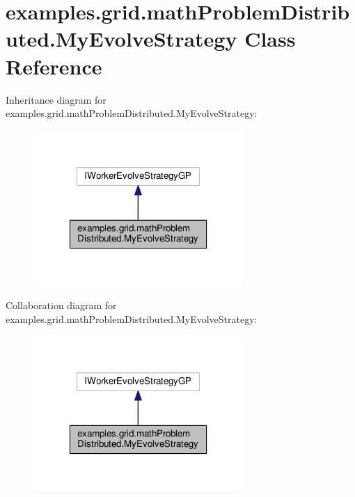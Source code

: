 \hypertarget{classexamples_1_1grid_1_1math_problem_distributed_1_1_my_evolve_strategy}{\section{examples.\-grid.\-math\-Problem\-Distributed.\-My\-Evolve\-Strategy Class Reference}
\label{classexamples_1_1grid_1_1math_problem_distributed_1_1_my_evolve_strategy}
}


Inheritance diagram for examples.\-grid.\-math\-Problem\-Distributed.\-My\-Evolve\-Strategy\-:
\nopagebreak
\begin{figure}[H]
\begin{center}
\leavevmode
\includegraphics[width=226pt]{classexamples_1_1grid_1_1math_problem_distributed_1_1_my_evolve_strategy__inherit__graph}
\end{center}
\end{figure}


Collaboration diagram for examples.\-grid.\-math\-Problem\-Distributed.\-My\-Evolve\-Strategy\-:
\nopagebreak
\begin{figure}[H]
\begin{center}
\leavevmode
\includegraphics[width=226pt]{classexamples_1_1grid_1_1math_problem_distributed_1_1_my_evolve_strategy__coll__graph}
\end{center}
\end{figure}
